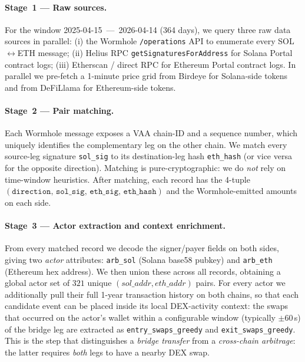 \documentclass[sigconf,nonacm,10pt]{acmart}
\begin{document}
\paragraph{Stage~1 --- Raw sources.} For the window
2025-04-15~---~2026-04-14 (364 days), we query three raw data sources in
parallel: (i) the Wormhole \texttt{/operations} API to enumerate every
SOL$\leftrightarrow$ETH message; (ii) Helius RPC
\texttt{getSignaturesForAddress} for Solana Portal contract logs;
(iii) Etherscan / direct RPC for Ethereum Portal contract logs. In parallel
we pre-fetch a 1-minute price grid from Birdeye for Solana-side tokens and
from DeFiLlama for Ethereum-side tokens.

\paragraph{Stage~2 --- Pair matching.} Each Wormhole message exposes a
VAA chain-ID and a sequence number, which uniquely identifies the
complementary leg on the other chain. We match every source-leg signature
\texttt{sol\_sig} to its destination-leg hash \texttt{eth\_hash} (or vice
versa for the opposite direction). Matching is pure-cryptographic: we do
\emph{not} rely on time-window heuristics. After matching, each record has
the 4-tuple $(\texttt{direction, sol\_sig, eth\_sig, eth\_hash})$ and the
Wormhole-emitted amounts on each side.

\paragraph{Stage~3 --- Actor extraction and context enrichment.} From every
matched record we decode the signer/payer fields on both sides, giving two
\emph{actor} attributes: \texttt{arb\_sol} (Solana base58 pubkey) and
\texttt{arb\_eth} (Ethereum hex address). We then union these across all
records, obtaining a global actor set of $321$ unique $(sol\_addr,
eth\_addr)$ pairs. For every actor we additionally pull their full 1-year
transaction history on both chains, so that each candidate event can be
placed inside its local DEX-activity context: the swaps that occurred on
the actor's wallet within a configurable window (typically $\pm\!60$\,s) of
the bridge leg are extracted as \texttt{entry\_swaps\_greedy} and
\texttt{exit\_swaps\_greedy}. This is the step that distinguishes a
\emph{bridge transfer} from a \emph{cross-chain arbitrage}: the latter
requires \emph{both} legs to have a nearby DEX swap.
\end{document}
